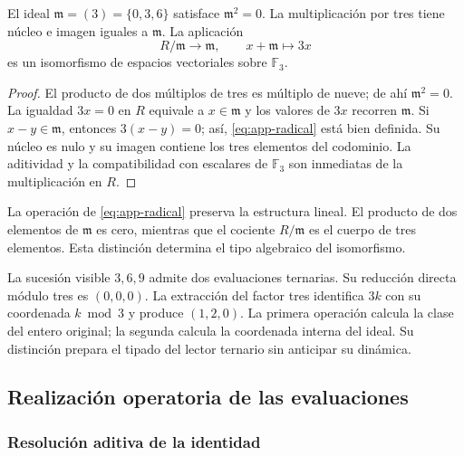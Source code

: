 \begin{bloqueindivisible}
\begin{proposicion}
\label{prop:app-radical}
El ideal $\mathfrak m=(3)=\{0,3,6\}$ satisface $\mathfrak m^2=0$. La multiplicación por tres tiene núcleo e imagen iguales a $\mathfrak m$. La aplicación
\begin{equation}
 R/\mathfrak m\longrightarrow\mathfrak m,
 \qquad x+\mathfrak m\longmapsto3x
 \label{eq:app-radical}
\end{equation}
es un isomorfismo de espacios vectoriales sobre $\mathbb F_3$.
\end{proposicion}

\begin{proof}
El producto de dos múltiplos de tres es múltiplo de nueve; de ahí $\mathfrak m^2=0$. La igualdad $3x=0$ en $R$ equivale a $x\in\mathfrak m$ y los valores de $3x$ recorren $\mathfrak m$. Si $x-y\in\mathfrak m$, entonces $3(x-y)=0$; así, \eqref{eq:app-radical} está bien definida. Su núcleo es nulo y su imagen contiene los tres elementos del codominio. La aditividad y la compatibilidad con escalares de $\mathbb F_3$ son inmediatas de la multiplicación en $R$.
\end{proof}
\end{bloqueindivisible}

La operación de \eqref{eq:app-radical} preserva la estructura lineal. El producto de dos elementos de $\mathfrak m$ es cero, mientras que el cociente $R/\mathfrak m$ es el cuerpo de tres elementos. Esta distinción determina el tipo algebraico del isomorfismo.

La sucesión visible $3,6,9$ admite dos evaluaciones ternarias. Su reducción directa módulo tres es $(0,0,0)$. La extracción del factor tres identifica $3k$ con su coordenada $k\bmod3$ y produce $(1,2,0)$. La primera operación calcula la clase del entero original; la segunda calcula la coordenada interna del ideal. Su distinción prepara el tipado del lector ternario sin anticipar su dinámica.

\subsection{Realización operatoria de las evaluaciones}
\label{sec:app-operadores}

\subsubsection{Resolución aditiva de la identidad}


